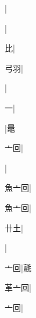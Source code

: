 \begin{multicols}{2}
{{}|{}\par
{}|{}\par
{比}|{}\par
{\cjk{}{\cnsym{}　}弓羽}|{}\par
{}|{}\par
{一}|{}\par
{\cjk{}{\cnsym{}　}{\cnsym{}　}{\cnsym{}　}}|{\cjk{}鼂}\par
{\cjk{}{\cnsym{}　}亠回}|{}\par
{}|{}\par
{\cjk{}魚亠回}|{}\par
{\cjk{}魚亠回}|{}\par
{\cjk{}{\cnsym{}　}卄土}|{}\par
{\cjk{}{\cnsym{}　}{\cnsym{}　}{\cnsym{}　}}|{}\par
{\cjk{}{\cnsym{}　}亠回}|{\cjk{}氈}\par
{\cjk{}革亠回}|{}\par
{亠回}|{}\par
}
\end{multicols}
